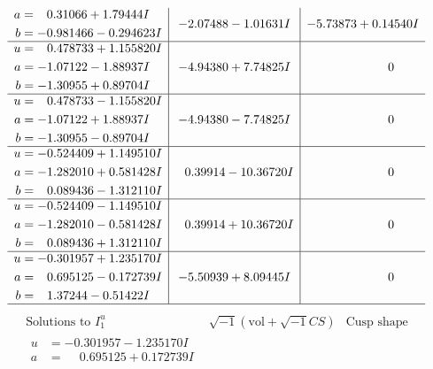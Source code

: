 \documentclass[1p]{elsarticle_modified}
\theoremstyle{definition}
\newcommand{\I}{\sqrt{-1}}
\begin{document}
$$\begin{array}{c|c|c}
\begin{aligned}
a &= \phantom{-}0.31066 + 1.79444 I \\
b &= -0.981466 - 0.294623 I\end{aligned}
 & -2.07488 - 1.01631 I & -5.73873 + 0.14540 I \\ \hline\begin{aligned}
u &= \phantom{-}0.478733 + 1.155820 I \\
a &= -1.07122 - 1.88937 I \\
b &= -1.30955 + 0.89704 I\end{aligned}
 & -4.94380 + 7.74825 I & \phantom{-0.000000 } 0 \\ \hline\begin{aligned}
u &= \phantom{-}0.478733 - 1.155820 I \\
a &= -1.07122 + 1.88937 I \\
b &= -1.30955 - 0.89704 I\end{aligned}
 & -4.94380 - 7.74825 I & \phantom{-0.000000 } 0 \\ \hline\begin{aligned}
u &= -0.524409 + 1.149510 I \\
a &= -1.282010 + 0.581428 I \\
b &= \phantom{-}0.089436 - 1.312110 I\end{aligned}
 & \phantom{-}0.39914 - 10.36720 I & \phantom{-0.000000 } 0 \\ \hline\begin{aligned}
u &= -0.524409 - 1.149510 I \\
a &= -1.282010 - 0.581428 I \\
b &= \phantom{-}0.089436 + 1.312110 I\end{aligned}
 & \phantom{-}0.39914 + 10.36720 I & \phantom{-0.000000 } 0 \\ \hline\begin{aligned}
u &= -0.301957 + 1.235170 I \\
a &= \phantom{-}0.695125 - 0.172739 I \\
b &= \phantom{-}1.37244 - 0.51422 I\end{aligned}
 & -5.50939 + 8.09445 I & \phantom{-0.000000 } 0\\
 \hline 
 \end{array}$$\newpage$$\begin{array}{c|c|c}  
\text{Solutions to }I^u_{1}& \I (\text{vol} + \sqrt{-1}CS) & \text{Cusp shape}\\
 \hline 
\begin{aligned}
u &= -0.301957 - 1.235170 I \\
a &= \phantom{-}0.695125 + 0.172739 I \\

\end{aligned}
\end{array}$$
\end{document}
